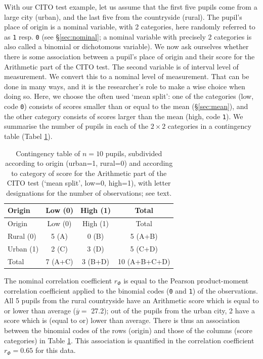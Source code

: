 \documentclass[
]{book}
\begin{document}
With our CITO test example, let us assume that the first five
pupils come from a large city (urban), and the last five from the
countryside (rural). The pupil's place of origin is a nominal variable,
with 2 categories, here randomly referred to as \texttt{1} resp. \texttt{0} (see
§\ref{sec:nominal}; a nominal variable with precisely 2
categories is also called a binomial or dichotomous variable).
We now ask ourselves whether there is some association between a
pupil's place of origin and their score for the Arithmetic part of the CITO test.
The second variable is of interval level of measurement. We convert this to a
nominal level of measurement. That can be done in many ways, and it is the
researcher's role to make a wise choice when doing so. Here, we
choose the often used `mean split': one of the categories (low, code \texttt{0})
consists of scores smaller than or equal to the mean
(§\ref{sec:mean}), and the other category consists of scores larger
than the mean (high, code \texttt{1}). We summarise the number of pupils in each of the
\(2\times 2\) categories in a contingency table
(Tabel \ref{tab:cito-contingency-table}).

\begin{longtable}[]{@{}lccc@{}}
\caption{\label{tab:cito-contingency-table} Contingency table of \(n=10\) pupils, subdivided according
to origin (urban=1, rural=0) and according to category of score for the Arithmetic part of
the CITO test (`mean split', low=0, high=1), with letter designations for the number
of observations; see text.}\tabularnewline
\toprule\noalign{}
Origin & Low (0) & High (1) & Total \\
\midrule\noalign{}
\endfirsthead
\toprule\noalign{}
Origin & Low (0) & High (1) & Total \\
\midrule\noalign{}
\endhead
\bottomrule\noalign{}
\endlastfoot
Rural (0) & 5 (A) & 0 (B) & 5 (A+B) \\
Urban (1) & 2 (C) & 3 (D) & 5 (C+D) \\
Total & 7 (A+C) & 3 (B+D) & 10 (A+B+C+D) \\
\end{longtable}

The nominal correlation coefficient \(r_\Phi\) is equal to the Pearson
product-moment correlation coefficient applied to the binomial codes
(\texttt{0} and \texttt{1}) of the observations. All 5 pupils from the rural countryside
have an Arithmetic score which is equal to or lower than average
(\(\overline{y}=\) 27.2); out of the pupils from the urban city, 2 have a
score which is (equal to or) lower than average. There is thus an association\\
between the binomial codes of the rows (origin) and those of the columns
(score categories) in Table \ref{tab:cito-contingency-table}.
This association is quantified in the
correlation coefficient \(r_\Phi=0.65\) for this data.
\end{document}
